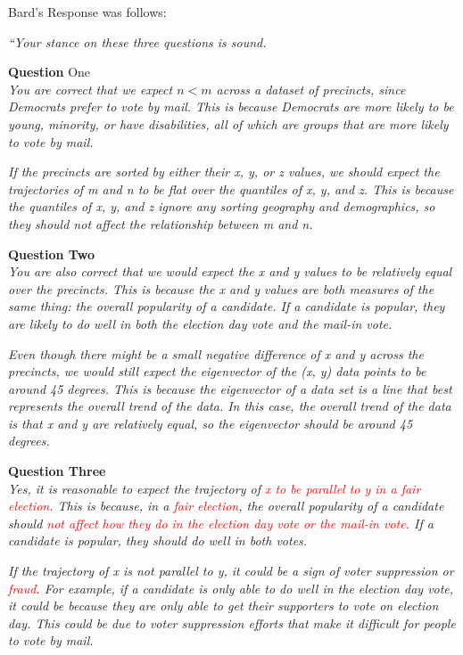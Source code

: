Bard's Response was follows:

\textit{``Your stance on these three questions is sound.}

\textbf{Question} One\\
\textit{You are correct that we expect $n<m$ across a dataset of precincts, since Democrats prefer to vote by mail. This is because Democrats are more likely to be young, minority, or have disabilities, all of which are groups that are more likely to vote by mail.}

\textit{If the precincts are sorted by either their x, y, or z values, we should expect the trajectories of m and n to be flat over the quantiles of x, y, and z. This is because the quantiles of x, y, and z ignore any sorting geography and demographics, so they should not affect the relationship between m and n.}

\textbf{Question Two}\\
\textit{You are also correct that we would expect the x and y values to be relatively equal over the precincts. This is because the x and y values are both measures of the same thing: the overall popularity of a candidate. If a candidate is popular, they are likely to do well in both the election day vote and the mail-in vote.}

\textit{Even though there might be a small negative difference of x and y across the precincts, we would still expect the eigenvector of the (x, y) data points to be around 45 degrees. This is because the eigenvector of a data set is a line that best represents the overall trend of the data. In this case, the overall trend of the data is that x and y are relatively equal, so the eigenvector should be around 45 degrees.}

\textbf{Question Three}\\
\textit{Yes, it is reasonable to expect the trajectory of \textcolor{red}{x to be parallel to y in a fair election}. This is because, in a \textcolor{red}{fair election}, the overall popularity of a candidate should \textcolor{red}{not affect how they do in the election day vote or the mail-in vote}. If a candidate is popular, they should do well in both votes.}

\textit{If the trajectory of x is not parallel to y, it could be a sign of voter suppression or \textcolor{red}{fraud}. For example, if a candidate is only able to do well in the election day vote, it could be because they are only able to get their supporters to vote on election day. This could be due to voter suppression efforts that make it difficult for people to vote by mail.}

